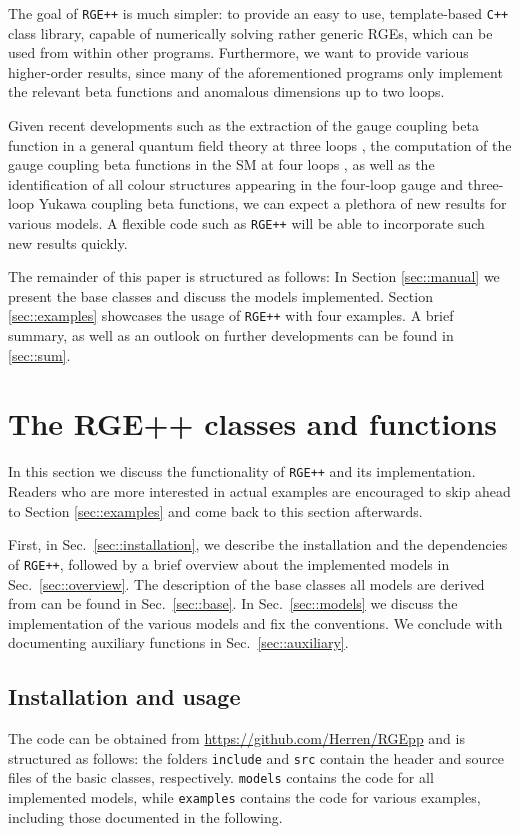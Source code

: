 \documentclass[preprint,12pt]{elsarticle}
\begin{document}
The goal of \texttt{RGE++} is much simpler: to provide an easy to use, template-based \texttt{C++} class library, capable of numerically solving rather generic
RGEs, which can be used from within other programs. Furthermore, we want to provide various higher-order results, since many of
the aforementioned programs only implement the relevant beta functions and anomalous dimensions up to two loops. 

Given recent developments
such as the extraction of the gauge coupling beta function in a general quantum field theory at three loops \cite{Poole:2019txl,Poole:2019kcm}, the computation
of the gauge coupling beta functions in the SM at four loops \cite{Davies:2019onf}, as well as the identification of all colour structures appearing in the four-loop
gauge and three-loop Yukawa coupling beta functions, we can expect a plethora of new results for various models. A flexible code such as \texttt{RGE++}
will be able to incorporate such new results quickly.

The remainder of this paper is structured as follows: In Section \ref{sec::manual} we present the base classes and discuss the models implemented.
Section \ref{sec::examples} showcases the usage of \texttt{RGE++} with four examples.
A brief summary, as well as an outlook on further developments can be found in \ref{sec::sum}.


\section{\label{sec::manual}The RGE++ classes and functions}
In this section we discuss the functionality of \texttt{RGE++} and its implementation. Readers who are more interested in actual examples are encouraged to skip ahead to
Section \ref{sec::examples} and come back to this section afterwards.

First, in Sec.~\ref{sec::installation}, we describe the installation and the dependencies of \texttt{RGE++},
followed by a brief overview about the implemented models in Sec.~\ref{sec::overview}.
The description of the base classes all models are derived from can be found in Sec.~\ref{sec::base}. In Sec.~\ref{sec::models} we discuss the implementation of the various models
and fix the conventions. We conclude with documenting auxiliary functions in Sec.~\ref{sec::auxiliary}.

\subsection{\label{sec::installation}Installation and usage}
The code can be obtained from \url{https://github.com/Herren/RGEpp} and is structured as follows: the folders \texttt{include} and \texttt{src} contain the header and source files of the basic classes, respectively.
\texttt{models} contains the code for all implemented models, while \texttt{examples} contains the code for various examples, including those documented in the following.
\end{document}
